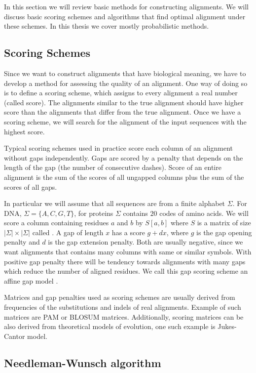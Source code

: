 In this section we will review basic methods for constructing alignments. We
will discuss basic scoring schemes and algorithms that find optimal alignment
under these schemes. In this thesis we cover mostly probabilistic methods.

\subsection{Scoring Schemes}

Since we want to construct alignments that have biological meaning, we have to
develop a method for assessing the quality of an alignment. One way of doing so
is to define a scoring scheme, which assigns to every alignment a real number
(called score). The alignments similar to the true alignment should have higher
score than the alignments that differ from the true alignment. Once we have a
scoring scheme, we will search for the alignment of the input sequences with
the highest score.

Typical scoring schemes used in practice score each column of
an alignment without gaps independently. Gaps are scored by a penalty
that depends on the length of the gap (the number of consecutive dashes). Score
of an entire alignment is the sum of the scores of all ungapped columns plus the
sum of the scores of all gaps.

In particular
we will assume that all sequences are from a finite alphabet $\Sigma$. For DNA,
$\Sigma=\{A,C,G,T\}$, for proteins $\Sigma$ contains $20$ codes of amino acids.
We will score a column containing residues $a$ and $b$ by $S[a,b]$ where $S$ is
a matrix of size $|\Sigma|\times|\Sigma|$ called .  A gap of length $x$ has a score $g+dx$, where $g$ is the gap opening
penalty and $d$ is the gap extension penalty. Both are usually negative, since we
want alignments that contains many columns with same or similar symbols. With
positive gap penalty there will be tendency towards alignments with many gaps
which reduce the number of aligned residues.  We call this gap scoring scheme an
affine gap model \cite{Durbin1998}. 

Matrices and gap penalties used as scoring schemes are usually derived from
frequencies of the substitutions and indels of real alignments. Example of such
matrices are PAM or BLOSUM matrices\cite{Durbin1998}. Additionally, scoring
matrices can be also derived from theoretical models of evolution, one such
example is Jukes-Cantor model\cite{Durbin1998}.

\subsection{Needleman-Wunsch algorithm}
\label{SECTION:NEEDLE}



